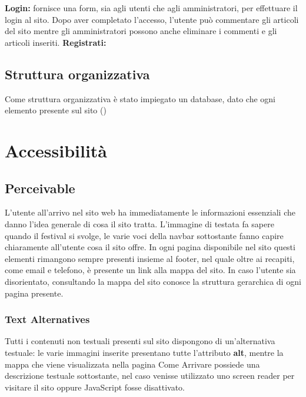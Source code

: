\documentclass[10pt, a4paper]{article}
\begin{document}
\newline \textbf{Login: }fornisce una form, sia agli utenti che agli amministratori, per effettuare il login al sito. Dopo aver completato l'accesso, l'utente può commentare gli articoli del sito mentre gli amministratori possono anche eliminare i commenti e gli articoli inseriti.
\newline \textbf{Registrati: }
\subsection{Struttura organizzativa}
Come struttura organizzativa è stato impiegato un database, dato che ogni elemento presente sul sito ()
\section{Accessibilità}

\subsection{Perceivable}
L’utente all’arrivo nel sito web ha immediatamente le informazioni essenziali che danno l’idea generale di cosa il sito tratta. L’immagine di testata fa sapere quando il festival si svolge, le varie voci della navbar sottostante fanno capire chiaramente all’utente cosa il sito offre. In ogni pagina disponibile nel sito questi elementi rimangono sempre presenti insieme al footer, nel quale oltre ai recapiti, come email e telefono, è presente un link alla mappa del sito. In caso l’utente sia disorientato, consultando la mappa del sito conosce la struttura gerarchica di ogni pagina presente.

\subsubsection{Text Alternatives}
Tutti i contenuti non testuali presenti sul sito dispongono di un'alternativa testuale: le varie immagini inserite presentano tutte l'attributo \textbf{alt}, mentre la mappa che viene visualizzata nella pagina Come Arrivare possiede una descrizione testuale sottostante, nel caso venisse utilizzato uno screen reader per visitare il sito oppure JavaScript fosse disattivato.
\end{document}
